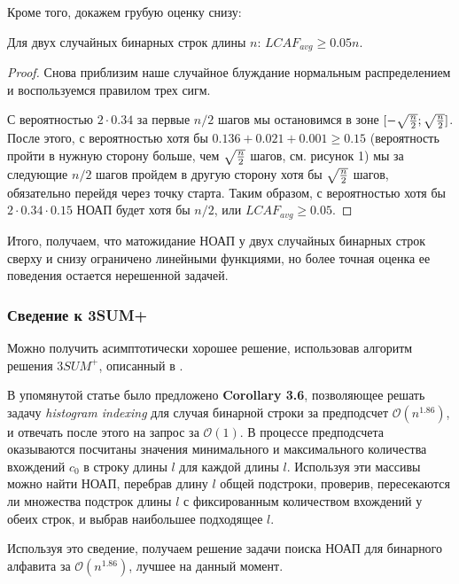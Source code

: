Кроме того, докажем грубую оценку снизу:
\begin{theorem}
Для двух случайных бинарных строк длины $n$: $LCAF_{avg} \ge 0.05n$.
\end{theorem}
\begin{proof}
Снова приблизим наше случайное блуждание нормальным распределением и воспользуемся правилом трех сигм.

С вероятностью $2 \cdot 0.34$ за первые $n/2$ шагов мы остановимся в зоне $[-\sqrt{n \over 2}; \sqrt{n \over 2}]$. После этого, с вероятностью хотя бы $0.136+0.021+0.001 \ge 0.15$ (вероятность пройти в нужную сторону больше, чем $\sqrt{n \over 2}$ шагов, см. рисунок 1) мы за следующие $n/2$ шагов пройдем в другую сторону хотя бы $\sqrt{n \over 2}$ шагов, обязательно перейдя через точку старта. Таким образом, с вероятностью хотя бы $2 \cdot 0.34 \cdot 0.15$ НОАП будет хотя бы $n/2$, или $LCAF_{avg} \ge 0.05$. %

\end{proof}

Итого, получаем, что матожидание НОАП у двух случайных бинарных строк сверху и снизу ограничено линейными функциями, но более точная оценка ее поведения остается нерешенной задачей.

\subsubsection{Сведение к 3SUM+}

Можно получить асимптотически хорошее решение, использовав алгоритм решения $3SUM^+$, описанный в \cite{2}. 

В упомянутой статье было предложено \textbf{Corollary 3.6}, позволяющее решать задачу \textit{histogram indexing} для случая бинарной строки за предподсчет $\mathcal{O}(n^{1.86})$, и отвечать после этого на запрос за $\mathcal{O}(1)$. В процессе предподсчета оказываются посчитаны значения минимального и максимального количества вхождений $c_0$ в строку длины $l$ для каждой длины $l$. Используя эти массивы можно найти НОАП, перебрав длину $l$ общей подстроки, проверив, пересекаются ли множества подстрок длины $l$ с фиксированным количеством вхождений у обеих строк, и выбрав наибольшее подходящее $l$.

Используя это сведение, получаем решение задачи поиска НОАП для бинарного алфавита за $\mathcal{O}(n^{1.86})$, лучшее на данный момент.

